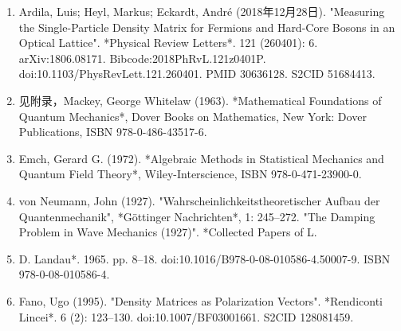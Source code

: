 \begin{enumerate}
\item Ardila, Luis; Heyl, Markus; Eckardt, André (2018年12月28日). "Measuring the Single-Particle Density Matrix for Fermions and Hard-Core Bosons in an Optical Lattice". *Physical Review Letters*. 121 (260401): 6. arXiv:1806.08171. Bibcode:2018PhRvL.121z0401P. doi:10.1103/PhysRevLett.121.260401. PMID 30636128. S2CID 51684413.  
\item 见附录，Mackey, George Whitelaw (1963). *Mathematical Foundations of Quantum Mechanics*, Dover Books on Mathematics, New York: Dover Publications, ISBN 978-0-486-43517-6.
\item Emch, Gerard G. (1972). *Algebraic Methods in Statistical Mechanics and Quantum Field Theory*, Wiley-Interscience, ISBN 978-0-471-23900-0.  
\item von Neumann, John (1927). "Wahrscheinlichkeitstheoretischer Aufbau der Quantenmechanik", *Göttinger Nachrichten*, 1: 245–272.  
"The Damping Problem in Wave Mechanics (1927)". *Collected Papers of L.\item D. Landau*. 1965. pp. 8–18. doi:10.1016/B978-0-08-010586-4.50007-9. ISBN 978-0-08-010586-4.  
\item Fano, Ugo (1995). "Density Matrices as Polarization Vectors". *Rendiconti Lincei*. 6 (2): 123–130. doi:10.1007/BF03001661. S2CID 128081459.
\end{enumerate}